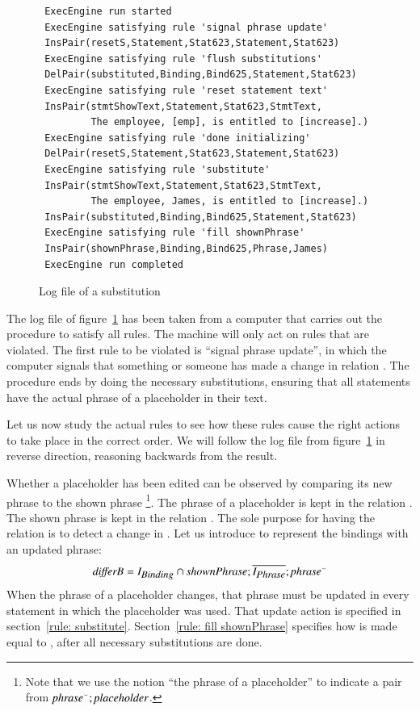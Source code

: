 \documentclass{elsarticle}
\begin{document}
\begin{figure}[htb]
\begin{verbatim}
 ExecEngine run started
 ExecEngine satisfying rule 'signal phrase update'
 InsPair(resetS,Statement,Stat623,Statement,Stat623)
 ExecEngine satisfying rule 'flush substitutions'
 DelPair(substituted,Binding,Bind625,Statement,Stat623)
 ExecEngine satisfying rule 'reset statement text'
 InsPair(stmtShowText,Statement,Stat623,StmtText,
         The employee, [emp], is entitled to [increase].)
 ExecEngine satisfying rule 'done initializing'
 DelPair(resetS,Statement,Stat623,Statement,Stat623)
 ExecEngine satisfying rule 'substitute'
 InsPair(stmtShowText,Statement,Stat623,StmtText,
         The employee, James, is entitled to [increase].)
 InsPair(substituted,Binding,Bind625,Statement,Stat623)
 ExecEngine satisfying rule 'fill shownPhrase'
 InsPair(shownPhrase,Binding,Bind625,Phrase,James)
 ExecEngine run completed
\end{verbatim}
\caption{Log file of a substitution}
\label{fig:log file}
\end{figure}
	The log file of figure~\ref{fig:log file} has been taken from a computer that carries out the procedure to satisfy all rules.
	The machine will only act on rules that are violated.
	The first rule to be violated is ``signal phrase update'', in which the computer signals that something or someone has made a change
	in relation .
	The procedure ends by doing the necessary substitutions,
	ensuring that all statements have the actual phrase of a placeholder in their text.

	Let us now study the actual rules to see how these rules cause the right actions to take place in the correct order.
	We will follow the log file from figure~\ref{fig:log file} in reverse direction,
	reasoning backwards from the result.

	Whether a placeholder has been edited can be observed by comparing its new phrase to the shown phrase%
\footnote{Note that we use the notion ``the phrase of a placeholder'' to indicate a pair from ${\text{\em phrase\/}}^\smallsmile;\text{\em placeholder\/}$.}.
	The phrase of a placeholder is kept in the relation .
	The shown phrase is kept in the relation .
	The sole purpose for having the relation  is to detect a change in .
	Let us introduce  to represent the bindings with an updated phrase:
\[\text{\em differB\/} = I_{\text{\em \small Binding\/}}\cap\text{\em shownPhrase\/};\overline{I_{\text{\em \small Phrase\/}}};{\text{\em phrase\/}}^\smallsmile\]
	When the phrase of a placeholder changes,
	that phrase must be updated in every statement in which the placeholder was used.
	That update action is specified in section~\ref{rule: substitute}.
	Section~\ref{rule: fill shownPhrase} specifies how  is made equal to ,
	after all necessary substitutions are done.
\end{document}
